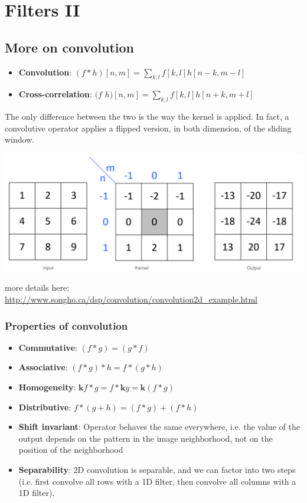 \chapter{Filters II}

\section{More on convolution}
\begin{itemize}
    \item \textbf{Convolution}: $(f * h)[n,m] = \sum_{k,l}f[k,l] h[n-k, m-l]$
    \item \textbf{Cross-correlation}: $(f$  $h)[n,m] = \sum_{k,l}f[k,l] h[n+k, m+l]$
\end{itemize}
The only difference between the two is the way the kernel is applied. In fact, a convolutive operator applies a flipped version, in both dimension, of the sliding window.
\begin{center}
    \includegraphics[scale =0.5]{images/flipped kernel.png}
\end{center}
more details here: \url{ http://www.songho.ca/dsp/convolution/convolution2d_example.html}

\subsection{Properties of convolution}
\begin{itemize}
    \item \textbf{Commutative}: $(f * g) = (g * f)$
    \item \textbf{Associative}: $(f * g) * h = f * (g * h)$
    \item \textbf{Homogeneity}: $\textbf{k}f*g = f*\textbf{k}g = \textbf{k}(f*g)$
    \item \textbf{Distributive}: $f * (g + h) = (f * g) + (f * h)$
    \item \textbf{Shift invariant}: Operator behaves the same everywhere, i.e. the value of the output depends on the pattern in the image neighborhood, not on the position of the neighborhood
    \item \textbf{Separability}: 2D convolution is separable, and we can factor into two steps (i.e. first convolve all rows with a 1D filter, then convolve all columns with a 1D filter).
\end{itemize}

